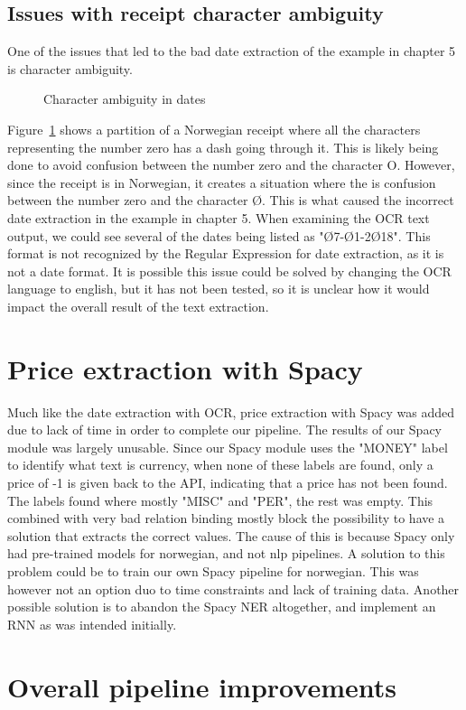 \subsection{Issues with receipt character ambiguity}\label{subsec:issues-with-receipt-character-ambiguity}
One of the issues that led to the bad date extraction of the example in chapter 5 is character ambiguity.

\begin{figure}[h]
    \caption{Character ambiguity in dates}
    \label{fig:zeroletter}
\end{figure}

Figure~\ref{fig:zeroletter} shows a partition of a Norwegian receipt where all the characters representing the number
zero has a dash going through it.
This is likely being done to avoid confusion between the number zero and the character O\@.
However, since the receipt is in Norwegian, it creates a situation where the is confusion between the number zero and the character Ø\@.
This is what caused the incorrect date extraction in the example in chapter 5.
When examining the OCR text output, we could see several of the dates being listed as "Ø7-Ø1-2Ø18".
This format is not recognized by the Regular Expression for date extraction, as it is not a date format.
It is possible this issue could be solved by changing the OCR language to english, but it has not been tested, so it is unclear how it would impact the overall result of the text extraction.

\section{Price extraction with Spacy}\label{sec:price-extraction-with-spacy}
Much like the date extraction with OCR, price extraction with Spacy was added due to lack of time in order to complete our pipeline.
The results of our Spacy module was largely unusable.
Since our Spacy module uses the "MONEY" label to identify what text is currency, when none of these labels are found, only a price of -1 is given back to the API, indicating that a price has not been found.
The labels found where mostly "MISC" and "PER", the rest was empty.
This combined with very bad relation binding mostly block the possibility to have a solution that extracts the correct values.
The cause of this is because Spacy only had pre-trained models for norwegian, and not nlp pipelines.
A solution to this problem could be to train our own Spacy pipeline for norwegian.
This was however not an option duo to time constraints and lack of training data.
Another possible solution is to abandon the Spacy NER altogether, and implement an RNN as was intended initially.

\section{Overall pipeline improvements}\label{sec:overall-pipeline-improvements}